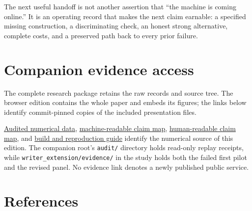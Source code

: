 The next useful handoff is not another assertion that ``the machine is
coming online.'' It is an operating record that makes the next claim
earnable: a specified missing construction, a discriminating check, an
honest strong alternative, complete costs, and a preserved path back to
every prior failure.

\section*{Companion evidence access}\label{evidence-access}

The complete research package retains the raw records and source tree.
The browser edition contains the whole paper and embeds its figures; the
links below identify commit-pinned copies of the included presentation files.

\href{https://github.com/MontrealAI/AGI-Alpha-Agent-v0/blob/53df20402b8af04ca2a56d77d99f1f5e33882f19/studies/invention-automation-research-20261029/data/audited.json}{Audited numerical data},
\href{https://github.com/MontrealAI/AGI-Alpha-Agent-v0/blob/53df20402b8af04ca2a56d77d99f1f5e33882f19/studies/invention-automation-research-20261029/claim-map.json}{machine-readable claim map},
\href{https://github.com/MontrealAI/AGI-Alpha-Agent-v0/blob/53df20402b8af04ca2a56d77d99f1f5e33882f19/studies/invention-automation-research-20261029/claim-map.md}{human-readable claim map}, and
\href{https://github.com/MontrealAI/AGI-Alpha-Agent-v0/blob/53df20402b8af04ca2a56d77d99f1f5e33882f19/studies/invention-automation-research-20261029/README.md}{build and reproduction guide} identify the numerical
source of this edition. The companion root's \texttt{audit/} directory
holds read-only replay receipts, while
\texttt{writer\_extension/evidence/} in the study holds both the failed
first pilot and the revised panel. No evidence link denotes a newly
published public service.

\section*{References}\label{references}

